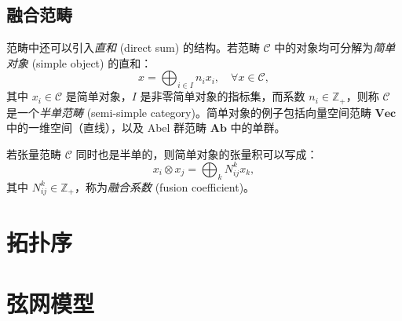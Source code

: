 \subsection{融合范畴}

范畴中还可以引入\emph{直和} (direct sum) 的结构。若范畴 $\mathcal{C}$ 中的对象均可分解为\emph{简单对象} (simple object) 的直和：
\begin{equation}
  x = \bigoplus_{i\in I} n_i x_i, \quad \forall x \in \mathcal{C},
\end{equation}
其中 $x_i\in\mathcal{C}$ 是简单对象，$I$ 是非零简单对象的指标集，而系数 $n_i\in\mathbb{Z}_+$，则称 $\mathcal{C}$ 是一个\emph{半单范畴} (semi-simple category)。简单对象的例子包括向量空间范畴 $\mathbf{Vec}$ 中的一维空间（直线），以及 Abel 群范畴 $\mathbf{Ab}$ 中的单群。

若张量范畴 $\mathcal{C}$ 同时也是半单的，则简单对象的张量积可以写成：
\begin{equation}
  x_i \otimes x_j = \bigoplus_k N_{ij}^k x_k,
\end{equation}
其中 $N_{ij}^k\in\mathbb{Z}_+$，称为\emph{融合系数} (fusion coefficient)。

\section{拓扑序}

\section{弦网模型}
